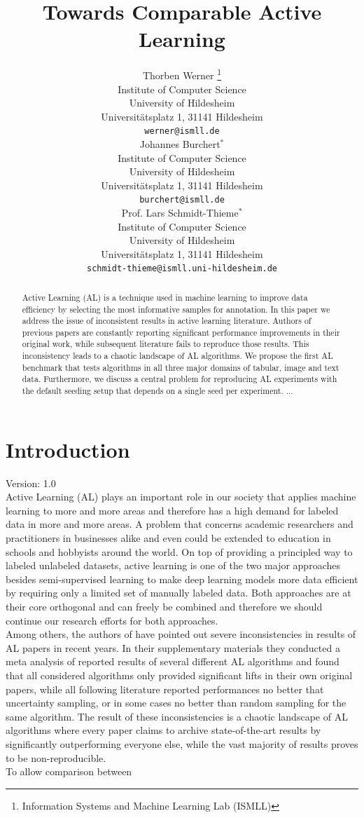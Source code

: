 \documentclass[]{article}
\title{Towards Comparable Active Learning}
\author{%
	Thorben Werner 
	\thanks{Information Systems and Machine Learning Lab (ISMLL)} 
	\\
	Institute of Computer Science\\
	University of Hildesheim\\
	Universitätsplatz 1, 31141 Hildesheim \\
	\texttt{werner@ismll.de} \\
	\And
	Johannes Burchert$^*$ \\
	Institute of Computer Science\\
	University of Hildesheim\\
	Universitätsplatz 1, 31141 Hildesheim \\
	\texttt{burchert@ismll.de} \\
	\AND
	Prof. Lars Schmidt-Thieme$^*$ \\
	Institute of Computer Science\\
	University of Hildesheim\\
	Universitätsplatz 1, 31141 Hildesheim \\
	\texttt{schmidt-thieme@ismll.uni-hildesheim.de} \\
}
\begin{document}
\maketitle

\begin{abstract}
	Active Learning (AL) is a technique used in machine learning to improve data efficiency by selecting the most informative samples for annotation. 
	In this paper we address the issue of inconsistent results in active learning literature.
	Authors of previous papers are constantly reporting significant performance improvements in their original work, while subsequent literature fails to reproduce those results. This inconsistency leads to a chaotic landscape of AL algorithms.
	We propose the first AL benchmark that tests algorithms in all three major domains of tabular, image and text data.
	Furthermore, we discuss a central problem for reproducing AL experiments with the default seeding setup that depends on a single seed per experiment.
	...
\end{abstract}

\section{Introduction}
{\color{red} Version: 1.0}\\
Active Learning (AL) plays an important role in our society that applies machine learning to more and more areas and therefore has a high demand for labeled data in more and more areas.
A problem that concerns academic researchers and practitioners in businesses alike and even could be extended to education in schools and hobbyists around the world.
On top of providing a principled way to labeled unlabeled datasets, active learning is one of the two major approaches besides semi-supervised learning to make deep learning models more data efficient by requiring only a limited set of manually labeled data.
Both approaches are at their core orthogonal and can freely be combined and therefore we should continue our research efforts for both approaches. \\
Among others, the authors of \cite{zhou2021towards} have pointed out severe inconsistencies in results of AL papers in recent years. 
In their supplementary materials they conducted a meta analysis of reported results of several different AL algorithms and found that all considered algorithms only provided significant lifts in their own original papers, while all following literature reported performances no better that uncertainty sampling, or in some cases no better than random sampling for the same algorithm.
The result of these inconsistencies is a chaotic landscape of AL algorithms where every paper claims to archive state-of-the-art results by significantly outperforming everyone else, while the vast majority of results proves to be non-reproducible. \\ [1mm]
%
To allow comparison between 
\end{document}
